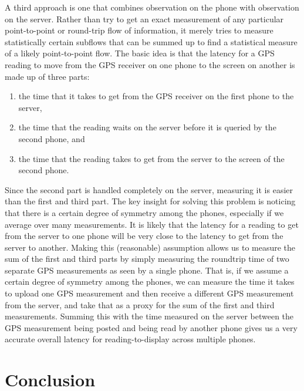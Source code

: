 \documentclass{acm_proc_article-sp}
\begin{document}
A third approach is one that combines observation on the phone with observation on the server.  Rather than try to get an exact measurement of any particular point-to-point or round-trip flow of information, it merely tries to measure statistically certain subflows that can be summed up to find a statistical measure of a likely point-to-point flow.  The basic idea is that the latency for a GPS reading to move from the GPS receiver on one phone to the screen on another is made up of three parts:
\begin{enumerate}
\item the time that it takes to get from the GPS receiver on the first phone to the server,
\item the time that the reading waits on the server before it is queried by the second phone, and
\item the time that the reading takes to get from the server to the screen of the second phone.
\end{enumerate}
Since the second part is handled completely on the server, measuring it is easier than the first and third part.  The key insight for solving this problem is noticing that there is a certain degree of symmetry among the phones, especially if we average over many measurements.  It is likely that the latency for a reading to get from the server to one phone will be very close to the latency to get from the server to another.  Making this (reasonable) assumption allows us to measure the sum of the first and third parts by simply measuring the roundtrip time of two separate GPS measurements as seen by a single phone.  That is, if we assume a certain degree of symmetry among the phones, we can measure the time it takes to upload one GPS measurement and then receive a different GPS measurement from the server, and take that as a proxy for the sum of the first and third measurements.  Summing this with the time measured on the server between the GPS measurement being posted and being read by another phone gives us a very accurate overall latency for reading-to-display across multiple phones.

\section{Conclusion}


\end{document}
